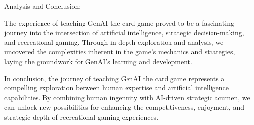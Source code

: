 \documentclass[
]{article}
\begin{document}
Analysis and Conclusion:

The experience of teaching GenAI the card game proved to be a
fascinating journey into the intersection of artificial intelligence,
strategic decision-making, and recreational gaming. Through in-depth
exploration and analysis, we uncovered the complexities inherent in the
game's mechanics and strategies, laying the groundwork for GenAI's
learning and development.

In conclusion, the journey of teaching GenAI the card game represents a
compelling exploration between human expertise and artificial
intelligence capabilities. By combining human ingenuity with AI-driven
strategic acumen, we can unlock new possibilities for enhancing the
competitiveness, enjoyment, and strategic depth of recreational gaming
experiences.
\end{document}
